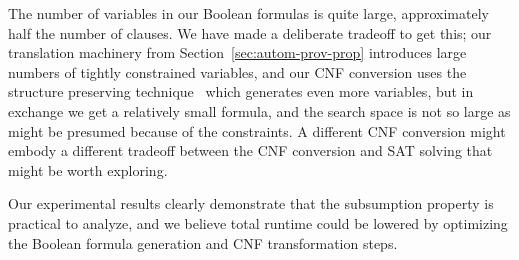 The number of variables in our Boolean formulas is quite large,
approximately half the number of clauses.  We have made a deliberate
tradeoff to get this; our translation machinery from
Section~\ref{sec:autom-prov-prop} introduces large numbers of tightly
constrained variables, and our CNF conversion uses the structure
preserving technique~\cite{plaisted86structure} which generates even
more variables, but in exchange we get a relatively small formula, and
the search space is not so large as might be presumed because of the
constraints.  A different CNF conversion might embody a different
tradeoff between the CNF conversion and SAT solving 
that might be worth exploring.

Our experimental results clearly demonstrate that the subsumption property is
practical to analyze, and we believe total runtime could be lowered
by optimizing the Boolean formula generation and CNF transformation
steps.


